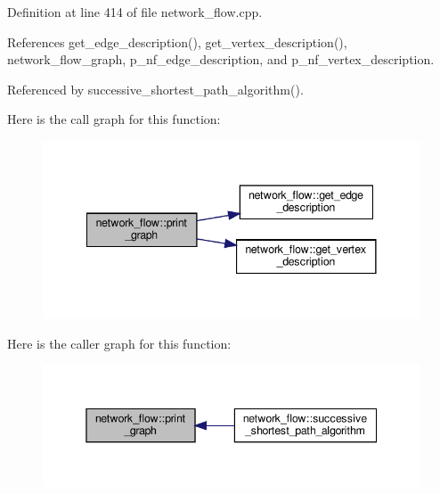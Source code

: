 Definition at line 414 of file network\+\_\+flow.\+cpp.



References get\+\_\+edge\+\_\+description(), get\+\_\+vertex\+\_\+description(), network\+\_\+flow\+\_\+graph, p\+\_\+nf\+\_\+edge\+\_\+description, and p\+\_\+nf\+\_\+vertex\+\_\+description.



Referenced by successive\+\_\+shortest\+\_\+path\+\_\+algorithm().

Here is the call graph for this function\+:
\nopagebreak
\begin{figure}[H]
\begin{center}
\leavevmode
\includegraphics[width=341pt]{d2/d4f/classnetwork__flow_ac934a543bc088ad9768b9938b4f19145_cgraph}
\end{center}
\end{figure}
Here is the caller graph for this function\+:
\nopagebreak
\begin{figure}[H]
\begin{center}
\leavevmode
\includegraphics[width=345pt]{d2/d4f/classnetwork__flow_ac934a543bc088ad9768b9938b4f19145_icgraph}
\end{center}
\end{figure}
\mbox{\label{classnetwork__flow_a69ab021e187be369fbf1e6c068942224}} 
